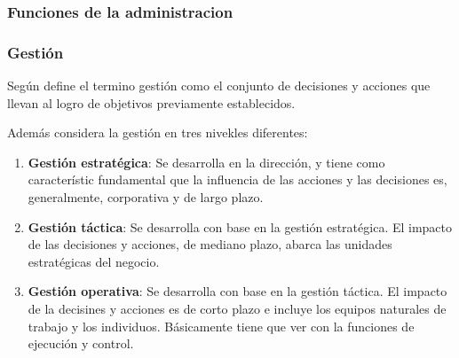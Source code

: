 \subsubsection{Funciones de la administracion}

\subsubsection{Gesti\'on}
Seg\'un \cite{beltran} define el termino gesti\'on como el conjunto de decisiones
y acciones que llevan al logro de objetivos previamente establecidos.

Adem\'as \cite{beltran} considera la gesti\'on en tres nivekles diferentes:
\begin{enumerate}
    \item \textbf{Gesti\'on estrat\'egica}: Se desarrolla en la direcci\'on, y tiene como
          caracter\'istic fundamental que la influencia de las acciones y las decisiones
          es, generalmente, corporativa y de largo plazo.
    \item \textbf{Gesti\'on t\'actica}: Se desarrolla con base en la gesti\'on
          estrat\'egica. El impacto de las decisiones y acciones, de mediano plazo,
          abarca las unidades estrat\'egicas del negocio.
    \item \textbf{Gesti\'on operativa}: Se desarrolla con base en la gesti\'on
          t\'actica. El impacto de la decisines y acciones es de corto plazo e incluye
          los equipos naturales de trabajo y los individuos. B\'asicamente tiene
          que ver con la funciones de ejecuci\'on y control.
\end{enumerate}
